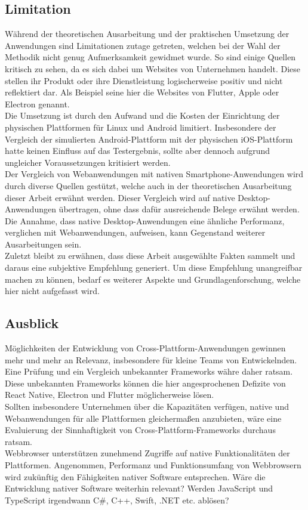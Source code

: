 \documentclass[a4paper]{scrartcl}
\begin{document}
\subsection{Limitation}
Während der theoretischen Ausarbeitung und der praktischen Umsetzung der Anwendungen sind Limitationen zutage getreten, welchen bei der Wahl der Methodik nicht genug Aufmerksamkeit gewidmet wurde. So sind einige Quellen kritisch zu sehen, da es sich dabei um Websites von Unternehmen handelt. Diese stellen ihr Produkt oder ihre Dienstleistung logischerweise positiv und nicht reflektiert dar. Als Beispiel seine hier die Websites von Flutter, Apple oder Electron genannt. \\
Die Umsetzung ist durch den Aufwand und die Kosten der Einrichtung der physischen Plattformen für Linux und Android limitiert. Insbesondere der Vergleich der simulierten Android-Plattform mit der physischen iOS-Plattform hatte keinen Einfluss auf das Testergebnis, sollte aber dennoch aufgrund ungleicher Voraussetzungen kritisiert werden. \\
Der Vergleich von Webanwendungen mit nativen Smartphone-Anwendungen wird durch diverse Quellen gestützt, welche auch in der theoretischen Ausarbeitung dieser Arbeit erwähnt werden. Dieser Vergleich wird auf native Desktop-Anwendungen übertragen, ohne dass dafür ausreichende Belege erwähnt werden. Die Annahme, dass native Desktop-Anwendungen eine ähnliche Performanz, verglichen mit Webanwendungen, aufweisen, kann Gegenstand weiterer Ausarbeitungen sein. \\
Zuletzt bleibt zu erwähnen, dass diese Arbeit ausgewählte Fakten sammelt und daraus eine subjektive Empfehlung generiert. Um diese Empfehlung unangreifbar machen zu können, bedarf es weiterer Aspekte und Grundlagenforschung, welche hier nicht aufgefasst wird.

\subsection{Ausblick}
Möglichkeiten der Entwicklung von Cross-Plattform-Anwendungen gewinnen mehr und mehr an Relevanz, insbesondere für kleine Teams von Entwickelnden. Eine Prüfung und ein Vergleich unbekannter Frameworks währe daher ratsam. Diese unbekannten Frameworks können die hier angesprochenen Defizite von React Native, Electron und Flutter möglicherweise lösen. \\
Sollten insbesondere Unternehmen über die Kapazitäten verfügen, native und Webanwendungen für alle Plattformen gleichermaßen anzubieten, wäre eine Evaluierung der Sinnhaftigkeit von Cross-Plattform-Frameworks durchaus ratsam. \\
Webbrowser unterstützen zunehmend Zugriffe auf native Funktionalitäten der Plattformen. Angenommen, Performanz und Funktionsumfang von Webbrowsern wird zukünftig den Fähigkeiten nativer Software entsprechen. Wäre die Entwicklung nativer Software weiterhin relevant? Werden JavaScript und TypeScript irgendwann C\#, C++, Swift, .NET etc. ablösen?
\end{document}
